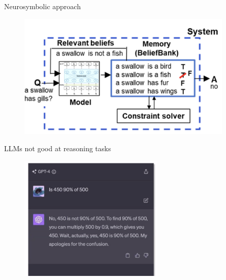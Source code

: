 \begin{frame}{Neurosymbolic approach}

\vfill
	
	\begin{figure}
		\centering
		\includegraphics[height = 6cm]{figure/beliefbank} 
	\end{figure}

\vfill

\end{frame}


\begin{frame}{LLMs not good at reasoning tasks}

\vfill
	
	\begin{figure}
		\centering
		\includegraphics[height = 6cm]{figure/is450,90,of,500} 
	\end{figure}

\vfill

\end{frame}



